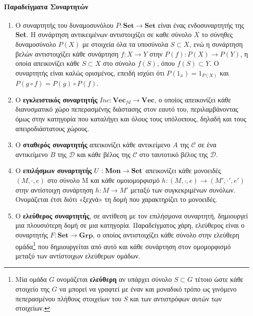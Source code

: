 \documentclass [a4paper,11pt] {book}
\theoremstyle{definition}
\theoremstyle{definition}
\begin{document}
\paragraph{Παραδείγματα Συναρτητών}
\begin{enumerate}
\item \label{powersetFunctor}
Ο συναρτητής του δυναμοσυνόλου $P :\textbf{Set} \to \textbf{Set}$ είναι ένας ενδοσυναρτητής της \textbf{Set}. Η συνάρτηση αντικειμένων αντιστοιχίζει σε καθε σύνολο $X$ το σύνηθες δυναμοσύνολο $P(X)$ με στοιχεία όλα τα υποσύνολα $S\subset X$, ενώ η συνάρτηση βελών αντιστοιχίζει κάθε συνάρτηση $f:X \to Y$ στην  $P(f): P(X) \to P(Y)$, η οποία απεικονίζει κάθε $S \subset X$ στο σύνολο $f(S)$, όπου $f(S) \subset Y$. Ο συναρτητής είναι καλώς ορισμένος, επειδή ισχύει ότι $P(1_{x})=1_{P(X)}$ και $P(g \circ f)= P(g) \circ  P(f)$.
\item Ο \textbf{εγκλειστικός συναρτητής} $Inc:\textbf{Vec}_{fd}\rightarrow\textbf{Vec}$, ο οποίος απεικονίζει κάθε διανυσματικό χώρο πεπερασμένης διάστασης στον εαυτό του, περιλαμβάνοντας όμως στην κατηγορία που καταλήγει και όλους τους υπόλοιπους, δηλαδή και τους απειροδιάστατους χώρους.
\item \label{constantFunctor}
Ο \textbf{σταθερός συναρτητής} απεικονίζει κάθε αντικείμενο $A$ της $\mathcal{C}$ σε ένα αντικείμενο $B$ της $\mathcal{D}$ και κάθε βέλος της $\mathcal{C}$ στο ταυτοτικό βέλος της $\mathcal{D}$.
\item \label{forgetfulFunctor}
Ο \textbf{επιλήσμων συναρτητής} $U: \bf Mon \to \bf Set$ απεικονίζει κάθε μονοειδές $(M,\cdot,e)$ στο σύνολο M και κάθε ομοιομορφισμό $h: (M,\cdot,e) \to (M',\cdot ',e')$ στην αντίστοιχη συνάρτηση $h:M \to M'$ μεταξύ των συγκεκριμένων συνόλων. Ονομάζεται έτσι διότι «ξεχνά» τη δομή που χαρακτηρίζει το μονοειδές.
\item \label{freeFunctor}
Ο \textbf{ελεύθερος συναρτητής}, σε αντίθεση με τον επιλήσμονα συναρτητή, δημιουργεί μια πλουσιότερη δομή σε μια κατηγορία. Παραδείγματος χάρη, ελεύθερος είναι ο συναρτητής $F: \textbf{Set}\to \textbf{Grp}$, ο οποίος αντιστοιχίζει κάθε σύνολο στην ελεύθερη ομάδα\footnote{Μία ομάδα $G$ ονομάζεται \textbf{ελεύθερη} αν υπάρχει σύνολο $S\subset G$ τέτοιο ώστε κάθε στοιχείο της $G$ να μπορεί να γραφτεί με έναν και μοναδικό τρόπο ως γινόμενο πεπερασμένου πλήθους στοιχείων του $S$ και των αντιστρόφων αυτών των στοιχείων.} που δημιουργείται από αυτό και κάθε συνάρτηση στον ομομορφισμό μεταξύ των αντίστοιχων ελεύθερων ομάδων.
\end{enumerate}
\end{document}
